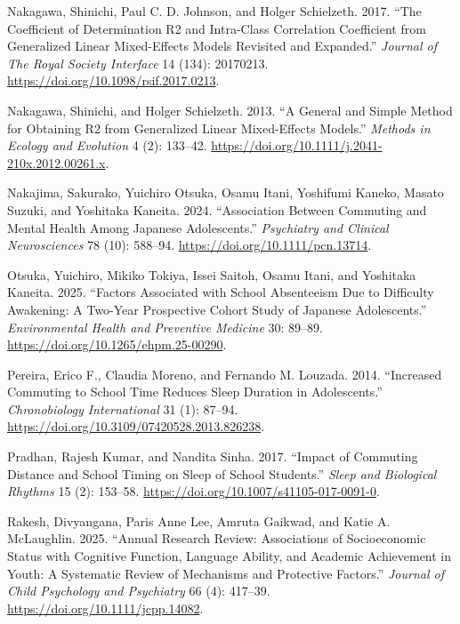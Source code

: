 \documentclass[
  12pt,
  titlepage]{article}
\newlength{\cslhangindent}
\newenvironment{CSLReferences}[2] %
 {\begin{list}{}{%
  \setlength{\itemindent}{0pt}
  \setlength{\leftmargin}{0pt}
  \setlength{\parsep}{0pt}
  \ifodd #1
   \setlength{\leftmargin}{\cslhangindent}
   \setlength{\itemindent}{-1\cslhangindent}
  \fi
  \setlength{\itemsep}{#2\baselineskip}}}
 {\end{list}}
\begin{document}
\begin{CSLReferences}{1}{1}
Nakagawa, Shinichi, Paul C. D. Johnson, and Holger Schielzeth. 2017.
{``The Coefficient of Determination {R2} and Intra-Class Correlation
Coefficient from Generalized Linear Mixed-Effects Models Revisited and
Expanded.''} \emph{Journal of The Royal Society Interface} 14 (134):
20170213. \url{https://doi.org/10.1098/rsif.2017.0213}.

Nakagawa, Shinichi, and Holger Schielzeth. 2013. {``A General and Simple
Method for Obtaining {R2} from Generalized Linear Mixed-Effects
Models.''} \emph{Methods in Ecology and Evolution} 4 (2): 133--42.
\url{https://doi.org/10.1111/j.2041-210x.2012.00261.x}.

Nakajima, Sakurako, Yuichiro Otsuka, Osamu Itani, Yoshifumi Kaneko,
Masato Suzuki, and Yoshitaka Kaneita. 2024. {``Association Between
Commuting and Mental Health Among {Japanese} Adolescents.''}
\emph{Psychiatry and Clinical Neurosciences} 78 (10): 588--94.
\url{https://doi.org/10.1111/pcn.13714}.

Otsuka, Yuichiro, Mikiko Tokiya, Issei Saitoh, Osamu Itani, and
Yoshitaka Kaneita. 2025. {``Factors Associated with School Absenteeism
Due to Difficulty Awakening: A Two-Year Prospective Cohort Study of
{Japanese} Adolescents.''} \emph{Environmental Health and Preventive
Medicine} 30: 89--89. \url{https://doi.org/10.1265/ehpm.25-00290}.

Pereira, Erico F., Claudia Moreno, and Fernando M. Louzada. 2014.
{``Increased Commuting to School Time Reduces Sleep Duration in
Adolescents.''} \emph{Chronobiology International} 31 (1): 87--94.
\url{https://doi.org/10.3109/07420528.2013.826238}.

Pradhan, Rajesh Kumar, and Nandita Sinha. 2017. {``Impact of Commuting
Distance and School Timing on Sleep of School Students.''} \emph{Sleep
and Biological Rhythms} 15 (2): 153--58.
\url{https://doi.org/10.1007/s41105-017-0091-0}.

Rakesh, Divyangana, Paris Anne Lee, Amruta Gaikwad, and Katie A.
McLaughlin. 2025. {``Annual {Research} {Review}: {Associations} of
Socioeconomic Status with Cognitive Function, Language Ability, and
Academic Achievement in Youth: A Systematic Review of Mechanisms and
Protective Factors.''} \emph{Journal of Child Psychology and Psychiatry}
66 (4): 417--39. \url{https://doi.org/10.1111/jcpp.14082}.


\end{CSLReferences}
\end{document}
